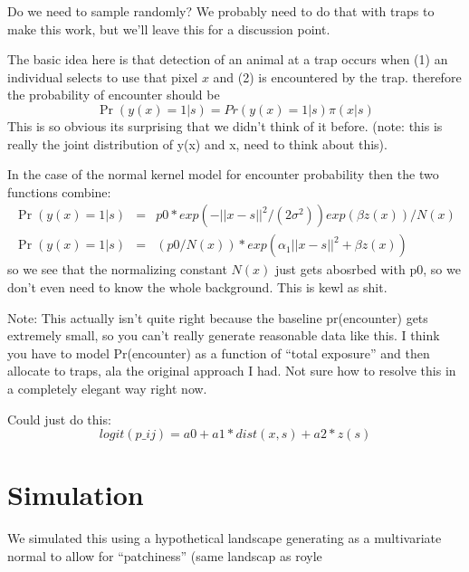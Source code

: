 \documentclass[12pt]{article}
\begin{document}
\begin{spacing}{1.8}
Do we need to sample randomly?  We probably need to do that with traps to make this work,
but we'll leave this for a discussion point. 

The basic idea here is that detection of an animal at a trap occurs when (1) an individual selects
to use that pixel $x$ and (2) is encountered by the trap. therefore the probability of encounter
should be
\[
 \Pr(y(x)=1|s) = Pr(y(x) = 1| s)\pi(x|s)
\]
This is so obvious its surprising that we didn't think of it before. 
(note: this is really the joint distribution of y(x) and x, need to think about this).

In the case of the normal kernel model for encounter probability then the two functions
combine:
\begin{eqnarray*}
\Pr(y(x)=1|s) &=&  p0*exp(- || x- s||^{2} / (2 \sigma^{2}))  exp( \beta z(x))/N(x)  \\
\Pr(y(x)=1|s) &=&  (p0/N(x))*exp( \alpha_{1} || x- s||^{2} + \beta z(x) )
\end{eqnarray*}
so we see that the normalizing constant $N(x)$ just gets abosrbed with p0, so we don't even
need to know the whole background.
This is kewl as shit. 


Note: This actually isn't quite right because the baseline pr(encounter) gets extremely small,
so you can't really generate reasonable data like this.
I think you have to model Pr(encounter) as a function of ``total exposure'' and then allocate
to traps, ala the original approach I had.  Not sure how to resolve this in a completely
elegant way right now. 


Could just do this:
\[
 logit(p\_{ij}) = a0 + a1*dist(x,s) + a2*z(s)
\]




\section{Simulation}

We simulated this using a hypothetical landscape generating as a multivariate normal to allow
for ``patchiness'' (same landscap as royle 














\newpage





\end{spacing}
\end{document}
